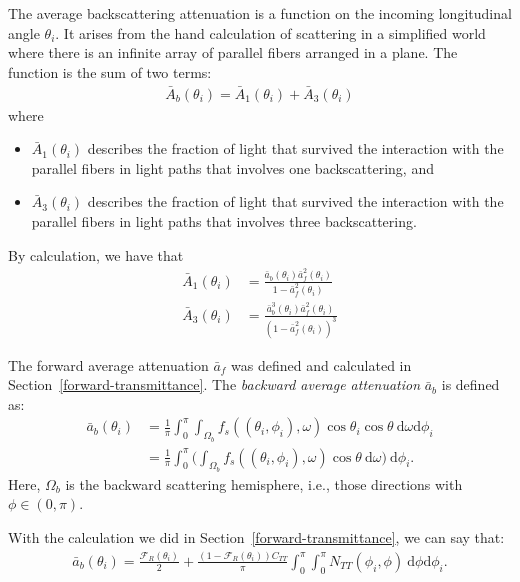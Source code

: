\documentclass[10pt]{article}
\newcommand{\dee}{\mathrm{d}}
\begin{document}
  The average backscattering attenuation is a function on the incoming longitudinal angle $\theta_i$.  It arises from the hand calculation of scattering in a simplified world where there is an infinite array of parallel fibers arranged in a plane.  The function is the sum of two terms:
  \begin{align*}
  	\bar{A}_b(\theta_i) = \bar{A}_1(\theta_i) + \bar{A}_3(\theta_i)
  \end{align*}
  where
  \begin{itemize}
  	\item $\bar{A}_1(\theta_i)$ describes the fraction of light that survived the interaction with the parallel fibers in light paths that involves one backscattering, and
  	\item $\bar{A}_3(\theta_i)$ describes the fraction of light that survived the interaction with the parallel fibers in light paths that involves three backscattering.
  \end{itemize}
  By calculation, we have that
  \begin{align*}
  	\bar{A}_1(\theta_i) &= \frac{\bar{a}_b(\theta_i) \bar{a}^2_f(\theta_i)}{1 - \bar{a}_f^2(\theta_i)} \\
  	\bar{A}_3(\theta_i) &= \frac{\bar{a}_b^3(\theta_i) \bar{a}_f^2(\theta_i)}{(1 - \bar{a}_f^2(\theta_i))^3}
  \end{align*}  

  The forward average attenuation $\bar{a}_f$ was defined and calculated in Section~\ref{forward-transmittance}.  The \emph{backward average attenuation} $\bar{a}_b$ is defined as:
  \begin{align*}
  	\bar{a}_b(\theta_i) 
  	&= \frac{1}{\pi} \int_{0}^\pi \int_{\Omega_b} f_s((\theta_i, \phi_i), \omega) \cos\theta_i \cos\theta\ \dee\omega\dee\phi_i \\
  	&= \frac{1}{\pi} \int_{0}^\pi \bigg( \int_{\Omega_b} f_s((\theta_i,\phi_i), \omega)\cos\theta\ \dee\omega \bigg)\ \dee\phi_i.
  \end{align*}
  Here, $\Omega_b$ is the backward scattering hemisphere, i.e., those directions with $\phi \in (0,\pi)$.

  With the calculation we did in Section~\ref{forward-transmittance}, we can say that:
  \begin{align*}
  	\bar{a}_b(\theta_i) = \frac{\mathscr{F}_R(\theta_i)}{2} + \frac{(1 - \mathscr{F}_R(\theta_i))C_{TT}}{\pi} \int_{0}^\pi \int_0^\pi N_{TT}(\phi_i, \phi)\ \dee\phi \dee\phi_i.
  \end{align*}
\end{document}
